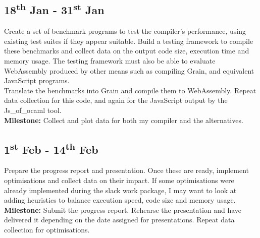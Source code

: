 \documentclass[12pt]{article}
\begin{document}


\subsection*{18\textsuperscript{th} Jan - 31\textsuperscript{st} Jan}%
Create a set of benchmark programs to test the compiler's performance, using existing test suites if they appear suitable. Build a testing framework to compile these benchmarks and collect data on the output code size, execution time and memory usage. The testing framework must also be able to evaluate WebAssembly produced by other means such as compiling Grain, and equivalent JavaScript programs. \\
Translate the benchmarks into Grain and compile them to WebAssembly. Repeat data collection for this code, and again for the JavaScript output by the Js\_of\_ocaml tool.\\
\textbf{Milestone: }Collect and plot data for both my compiler and the alternatives. 

\subsection*{1\textsuperscript{st} Feb - 14\textsuperscript{th} Feb}%
Prepare the progress report and presentation. Once these are ready, implement optimisations and collect data on their impact. If some optimisations were already implemented  during the slack work package, I may want to look at adding heuristics to balance execution speed, code size and memory usage. \\
\textbf{Milestone: }Submit the progress report. Rehearse the presentation and have delivered it depending on the date assigned for presentations. Repeat data collection for optimisations. %
\end{document}
